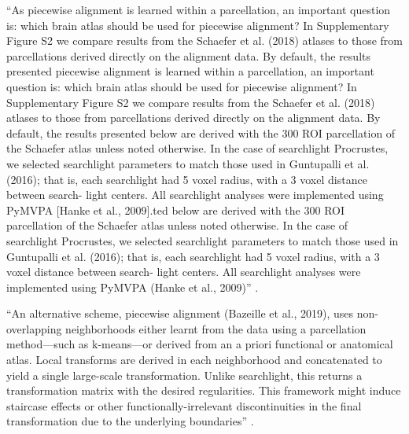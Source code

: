 ``As piecewise alignment is learned within a parcellation, an important question
is: which brain atlas should be used for piecewise alignment? In Supplementary
Figure S2 we compare results from the Schaefer et al. (2018) atlases to those
from parcellations derived directly on the alignment data. By default, the
results presented piecewise alignment is learned within a parcellation, an
important question is: which brain atlas should be used for piecewise alignment?
In Supplementary Figure S2 we compare results from the Schaefer et al. (2018)
atlases to those from parcellations derived directly on the alignment data. By
default, the results presented below are derived with the 300 ROI parcellation
of the Schaefer atlas unless noted otherwise. In the case of searchlight
Procrustes, we selected searchlight parameters to match those used in Guntupalli
et al. (2016); that is, each searchlight had 5 voxel radius, with a 3 voxel
distance between search- light centers. All searchlight analyses were
implemented using PyMVPA [Hanke et al., 2009].ted below are derived with the 300
ROI parcellation of the Schaefer atlas unless noted otherwise. In the case of
searchlight Procrustes, we selected searchlight parameters to match those used
in Guntupalli et al. (2016); that is, each searchlight had 5 voxel radius, with
a 3 voxel distance between search- light centers. All searchlight analyses were
implemented using PyMVPA (Hanke et al., 2009)'' \citep{bazeille2021empirical}.

``An alternative scheme, piecewise alignment (Bazeille et al., 2019), uses
non-overlapping neighborhoods either learnt from the data using a parcellation
method—such as k-means—or derived from an a priori functional or anatomical
atlas. Local transforms are derived in each neighborhood and concatenated to
yield a single large-scale transformation. Unlike searchlight, this returns a
transformation matrix with the desired regularities. This framework might induce
staircase effects or other functionally-irrelevant discontinuities in the final
transformation due to the underlying boundaries'' \citep{bazeille2021empirical}.


